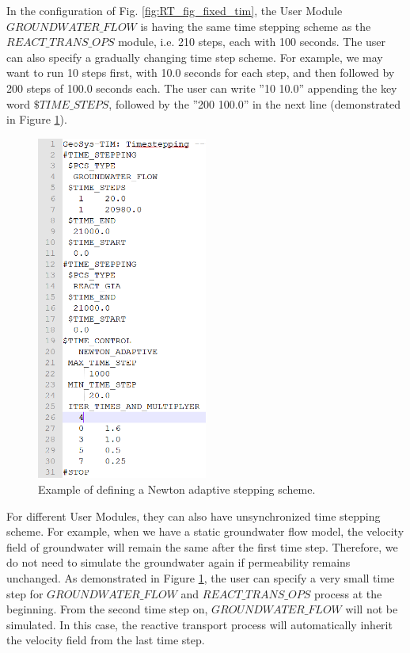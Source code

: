 In the configuration of Fig. \ref{fig:RT_fig_fixed_tim}, the User Module $GROUNDWATER\_FLOW$ is having the same time stepping scheme as the $REACT\_TRANS\_OPS$ module, i.e. 210 steps, each with 100 seconds. The user can also specify a gradually changing time step scheme. For example, we may want to run 10 steps first, with 10.0 seconds for each step, and then followed by 200 steps of 100.0 seconds each. The user can write ''10   10.0'' appending the key word $\$TIME\_STEPS$, followed by the ''200 100.0'' in the next line (demonstrated in Figure \ref{fig:RT_fig_adapt_tim}). 

\begin{figure}
\includegraphics[width=0.5\textwidth]{RT/figs/RT_fig_adapt_tim}
\caption{Example of defining a Newton adaptive stepping scheme. }
\label{fig:RT_fig_adapt_tim}
\end{figure}

For different User Modules, they can also have unsynchronized time stepping scheme. For example, when we have a static groundwater flow model, the velocity field of groundwater will remain the same after the first time step. Therefore, we do not need to simulate the groundwater again if permeability remains unchanged. As demonstrated in Figure \ref{fig:RT_fig_adapt_tim}, the user can specify a very small time step for $GROUNDWATER\_FLOW$ and $REACT\_TRANS\_OPS$ process at the beginning. From the second time step on, $GROUNDWATER\_FLOW$ will not be simulated. In this case, the reactive transport process will automatically inherit the velocity field from the last time step.


